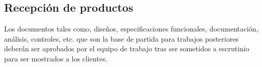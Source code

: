 \subsection{Recepción de productos}

Los documentos tales como, diseños, especificaciones funcionales, documentación, análisis, controles, etc. que son la base de partida para trabajos posteriores deberán ser aprobados por el equipo de trabajo tras ser sometidos a escrutinio para ser mostrados a los clientes.
